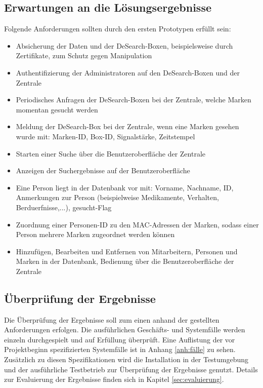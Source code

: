 \subsection{Erwartungen an die Lösungsergebnisse}
Folgende Anforderungen sollten durch den ersten Prototypen erfüllt sein:
\begin{itemize}
	\item  Absicherung der Daten und der DeSearch-Boxen, beispielsweise durch Zertifikate, zum Schutz gegen Manipulation
	\item Authentifizierung der Administratoren auf den DeSearch-Boxen und der Zentrale 
	\item Periodisches Anfragen der DeSearch-Boxen bei der Zentrale, welche Marken momentan gesucht werden
	\item Meldung der DeSearch-Box bei der Zentrale, wenn eine Marken gesehen wurde mit: Marken-ID, Box-ID, Signalstärke, Zeitstempel
	\item Starten einer Suche über die Benutzeroberfläche der Zentrale
	\item Anzeigen der Suchergebnisse auf der Benutzeroberfläche
	\item Eine Person liegt in der Datenbank vor mit: Vorname, Nachname, ID, Anmerkungen zur Person (beispielweise Medikamente, Verhalten, Berduerfnisse,...), gesucht-Flag
	\item Zuordnung einer Personen-ID zu den MAC-Adressen der Marken, sodass einer Person mehrere Marken zugeordnet werden können
	\item Hinzufügen, Bearbeiten und Entfernen von Mitarbeitern, Personen und Marken in der Datenbank, Bedienung über die Benutzeroberfläche der Zentrale
\end{itemize}


\subsection{Überprüfung der Ergebnisse}
Die Überprüfung der Ergebnisse soll zum einen anhand der gestellten Anforderungen erfolgen. Die ausführlichen Geschäfts- und Systemfälle werden einzeln durchgespielt und auf Erfüllung überprüft. Eine Auflistung der vor Projektbeginn spezifizierten Systemfälle ist in Anhang \ref{anh:fälle} zu sehen. Zusätzlich zu diesen Spezifikationen wird die Installation in der Testumgebung und der ausführliche Testbetrieb zur Überprüfung der Ergebnisse genutzt. Details zur Evaluierung der Ergebnisse finden sich in Kapitel \ref{sec:evaluierung}.










